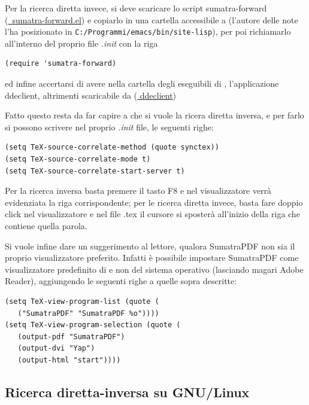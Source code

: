 \documentclass[10pt,a4paper]{article}
\begin{document}
Per la ricerca diretta invece, si deve scaricare lo script
\textsf{sumatra-forward} (\href{http://william.famille-blum.org/software/sumatra/sumatra-forward.el}{\mano{}~sumatra-forward.el})
e copiarlo in una cartella accessibile a \emacs{} (l'autore delle note
l'ha posizionato in \texttt{C:/Programmi/emacs/bin/site-lisp}), per
poi richiamarlo all'interno del proprio file \emph{.init} con la riga
\begin{Verbatim}
(require 'sumatra-forward)
\end{Verbatim}
ed infine accertarsi di avere nella cartella degli eseguibili di
\emacs, l'applicazione \textsf{ddeclient}, altrimenti scaricabile da
(\href{http://ftp.gnu.org/old-gnu/emacs/windows/docs/ntemacs/contrib/ddeclient.zip}{\mano{}
  \textsf{ddeclient}})

Fatto questo resta da far capire a \emacs{} che si vuole la ricera
diretta inversa, e per farlo si possono scrivere nel proprio \emph{.init}
file, le seguenti righe:
\begin{Verbatim}
(setq TeX-source-correlate-method (quote synctex))
(setq TeX-source-correlate-mode t)
(setq TeX-source-correlate-start-server t)
\end{Verbatim}

Per la ricerca inversa basta premere il tasto \textsf{F8} e nel
visualizzatore verrà evidenziata la riga corrispondente; per le
ricerca diretta invece, basta fare doppio click nel visualizzatore e
nel file .tex il cursore si sposterà all'inizio della riga che
contiene quella parola.

Si vuole infine dare un suggerimento al lettore, qualora \textsf{SumatraPDF}
non sia il proprio visualizzatore preferito. Infatti è possibile
impostare \textsf{SumatraPDF} come visualizzatore predefinito di \emacs{} e non
del sistema operativo (lasciando magari \textsf{Adobe Reader}), aggiungendo le
seguenti righe a quelle sopra descritte:
\begin{Verbatim}
(setq TeX-view-program-list (quote (
   ("SumatraPDF" "SumatraPDF %o"))))
(setq TeX-view-program-selection (quote (
   (output-pdf "SumatraPDF") 
   (output-dvi "Yap") 
   (output-html "start"))))
\end{Verbatim}

\subsection*{Ricerca diretta-inversa su GNU/Linux}
\label{sec:fislinux}

\textcolor{red}{\lipsum[1]}
\end{document}
